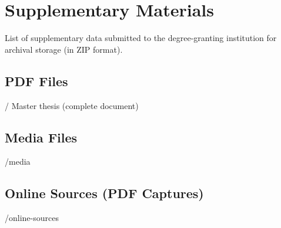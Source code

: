 \chapter{Supplementary Materials}
\label{app:materials}


List of supplementary data submitted to the degree-granting institution for archival storage
(in ZIP format).


\section{PDF Files}
\begin{FileList}{/}
 Master thesis (complete document)
\end{FileList}

\section{Media Files}
\begin{FileList}{/media}

\end{FileList}


\section{Online Sources (PDF Captures)}
\begin{FileList}{/online-sources}
 
\end{FileList}




